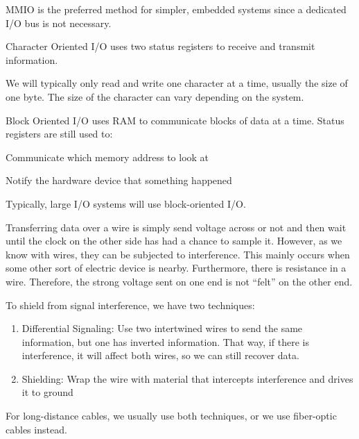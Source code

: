 \documentclass[12pt]{report}
\begin{document}
MMIO is the preferred method for simpler, embedded systems since a dedicated I/O bus is not necessary.

\begin{dfnbox}{Character Oriented I/O}
	 uses two status registers to receive and transmit information.
\end{dfnbox}

We will typically only read and write one character at a time, usually the size of one byte. The size of the character can vary depending on the system.

\begin{dfnbox}{Block Oriented I/O}
	 uses RAM to communicate blocks of data at a time. Status registers are still used to:
	\begin{dfnitems}
		\item Communicate which memory address to look at
		\item Notify the hardware device that something happened
	\end{dfnitems}
\end{dfnbox}

Typically, large I/O systems will use block-oriented I/O.

Transferring data over a wire is simply send voltage across or not and then wait until the clock on the other side has had a chance to sample it. However, as we know with wires, they can be subjected to interference. This mainly occurs when some other sort of electric device is nearby. Furthermore, there is resistance in a wire. Therefore, the strong voltage sent on one end is not “felt” on the other end.

To shield from signal interference, we have two techniques:

\begin{enumerate}
	\item Differential Signaling: Use two intertwined wires to send the same information, but one has inverted information. That way, if there is interference, it will affect both wires, so we can still recover data.
	\item Shielding: Wrap the wire with material that intercepts interference and drives it to ground
\end{enumerate}

For long-distance cables, we usually use both techniques, or we use fiber-optic cables instead.
\end{document}
